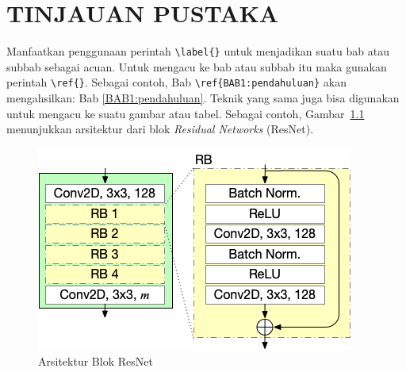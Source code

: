 \chapter{TINJAUAN PUSTAKA}
\label{BAB2:tinjauan}

Manfaatkan penggunaan perintah \verb|\label{}| untuk menjadikan suatu bab atau subbab sebagai acuan. Untuk mengacu ke bab atau subbab itu maka gunakan perintah \verb|\ref{}|. Sebagai contoh, Bab \verb|\ref{BAB1:pendahuluan}| akan mengahsilkan: Bab \ref{BAB1:pendahuluan}. Teknik yang sama juga bisa digunakan untuk mengacu ke suatu gambar atau tabel. Sebagai contoh, Gambar~\ref{fig:arsitektur} menunjukkan arsitektur dari blok \textit{Residual Networks} (ResNet).
\begin{figure}[h]
    \centering
    \includegraphics[scale=0.5]{BAB-2/resnet receiver.png}
    \caption{Arsitektur Blok ResNet}
    \label{fig:arsitektur}
\end{figure}

